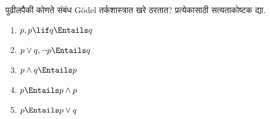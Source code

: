 \documentclass[../../../include/open-logic-section]{subfiles}
\begin{document}
\begin{prob}
  पुढीलपैकी कोणते संबंध G\"odel तर्कशास्त्रात खरे ठरतात?
  प्रत्येकासाठी सत्यताकोष्टक द्या.
  \begin{enumerate}
    \item $p, p \lif q \Entails q$
    \item $p \lor q, \lnot p \Entails q$
    \item $p \land q \Entails p$
    \item $p \Entails p \land p$
    \item $p \Entails p \lor q$
  \end{enumerate}
\end{prob}
\end{document}
